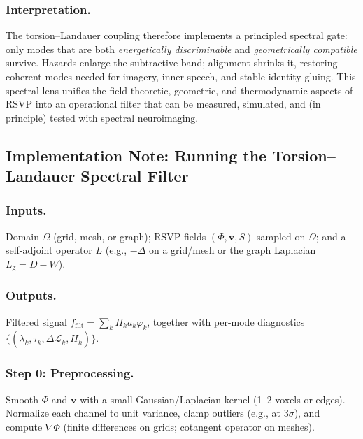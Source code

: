 \documentclass[a4paper,11pt]{article}
\begin{document}
\subsubsection{Interpretation.}
The torsion--Landauer coupling therefore implements a principled spectral
gate: only modes that are both \emph{energetically discriminable} and \emph{geometrically
compatible} survive. Hazards enlarge the subtractive band; alignment shrinks it,
restoring coherent modes needed for imagery, inner speech, and stable identity
gluing. This spectral lens unifies the field-theoretic, geometric, and
thermodynamic aspects of RSVP into an operational filter that can be measured,
simulated, and (in principle) tested with spectral neuroimaging.

\subsection{Implementation Note: Running the Torsion--Landauer Spectral Filter}
\label{sec:impl-spectral}

\subsubsection{Inputs.} Domain $\Omega$ (grid, mesh, or graph); RSVP fields
$(\Phi,\mathbf v,S)$ sampled on $\Omega$; and a self-adjoint operator $L$
(e.g., $-\Delta$ on a grid/mesh or the graph Laplacian
$L_{\mathrm g}=D-W$).

\subsubsection{Outputs.} Filtered signal
$f_{\mathrm{filt}}=\sum_k H_k a_k \varphi_k$, together with per-mode
diagnostics
$\{(\lambda_k,\tau_k,\Delta\widetilde{\mathcal{L}}_k,H_k)\}$.

\subsubsection{Step 0: Preprocessing.}
Smooth $\Phi$ and $\mathbf v$ with a small Gaussian/Laplacian kernel
(1--2 voxels or edges). Normalize each channel to unit variance, clamp
outliers (e.g., at $3\sigma$), and compute $\nabla\Phi$ (finite differences
on grids; cotangent operator on meshes).
\end{document}
